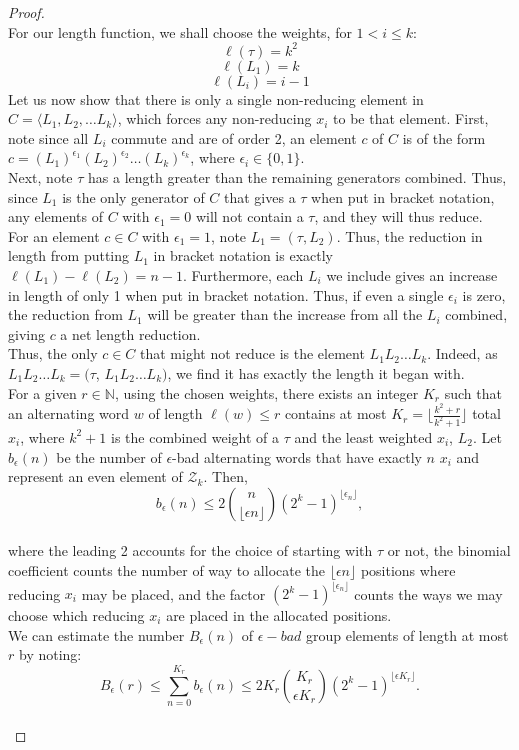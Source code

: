 \documentclass[11pt]{amsart}
\theoremstyle{definition}
\theoremstyle{remark}
\numberwithin{equation}{section}
\begin{document}
\begin{proof} \text{\space}\\
\indent For our length function, we shall choose the weights, for $1<i\leq k$: $$\ell(\tau)=k^2$$ $$\ell(L_1)=k$$ $$\ell(L_i)=i-1$$
\indent Let us now show that there is only a single non-reducing element in $C=\langle L_1,L_2,\ldots L_k\rangle$, which forces any non-reducing $x_i$ to be that element. First, note since all $L_i$ commute and are of order 2, an element $c$ of $C$ is of the form $c=(L_1)^{\epsilon_1}(L_2)^{\epsilon_2}\ldots (L_k)^{\epsilon_k}$, where $\epsilon_i\in \{0,1\}$.\\
\indent Next, note $\tau$ has a length greater than the remaining generators combined. Thus, since $L_1$ is the only generator of $C$ that gives a $\tau$ when put in bracket notation, any elements of $C$ with $\epsilon_1=0$ will not contain a $\tau$, and they will thus reduce.\\
\indent For an element $c\in C$ with $\epsilon_1=1$, note $L_1=(\tau,L_2)$. Thus, the reduction in length from putting $L_1$ in bracket notation is exactly $\ell(L_1)-\ell(L_2)=n-1$. Furthermore, each $L_i$ we include gives an increase in length of only 1 when put in bracket notation. Thus, if even a single $\epsilon_i$ is zero, the reduction from $L_1$ will be greater than the increase from all the $L_i$ combined, giving $c$ a net length reduction.\\
\indent Thus, the only $c\in C$ that might not reduce is the element $L_1L_2\ldots L_k$. Indeed, as $L_1L_2\ldots L_k=(\tau$, $L_1L_2\ldots L_k)$, we find it has exactly the length it began with.\\














\indent For a given $r\in \mathbb{N}$, using the chosen weights, there exists an integer $K_r$ such that an alternating word $w$ of length $\ell(w)\leq r$ contains at most $K_r=\lfloor\frac{k^2+r}{k^2+1}\rfloor$ total $x_i$, where $k^2+1$ is the combined weight of a $\tau$ and the least weighted $x_i$, $L_2$. Let $b_\epsilon(n)$ be the number of $\epsilon$-bad alternating words that have exactly $n$ $x_i$ and represent an even element of $\mathcal{Z}_k$. Then, $$b_\epsilon(n)\leq 2 \binom{n}{\lfloor \epsilon n\rfloor}(2^k-1)^{\lfloor\epsilon_n\rfloor}, $$\\
where the leading 2 accounts for the choice of starting with $\tau$ or not, the binomial coefficient counts the number of way to allocate the $\lfloor \epsilon n\rfloor$ positions where reducing $x_i$ may be placed, and the factor $(2^k-1)^{\lfloor \epsilon_n\rfloor}$ counts the ways we may choose which reducing $x_i$ are placed in the allocated positions.\\
\indent We can estimate the number $B_\epsilon(n)$ of $\epsilon-bad$ group elements of length at most $r$ by noting:\\
$$B_\epsilon(r)\leq \sum_{n=0}^{K_r} b_\epsilon(n)\leq 2 K_r \binom{K_r}{\epsilon K_r} (2^k-1)^{\lfloor \epsilon K_r\rfloor}.$$\\


\end{proof}
\end{document}

